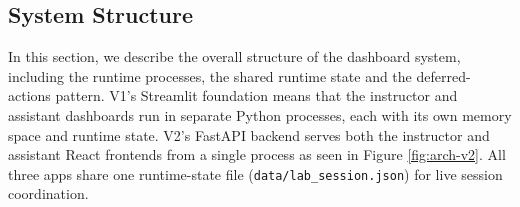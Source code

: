\subsection{System Structure} \label{sec:structure}


In this section, we describe the overall structure of the dashboard system, including the runtime processes, the shared runtime state and the deferred-actions pattern. 
V1's Streamlit foundation means that the instructor and assistant dashboards run in separate Python processes, each with its own memory space and runtime state. 
V2's FastAPI backend serves both the instructor and assistant React frontends from a single process as seen in Figure \ref{fig:arch-v2}.
All three apps share one runtime-state file (\texttt{data/lab\_session.json}) for live session coordination. 

